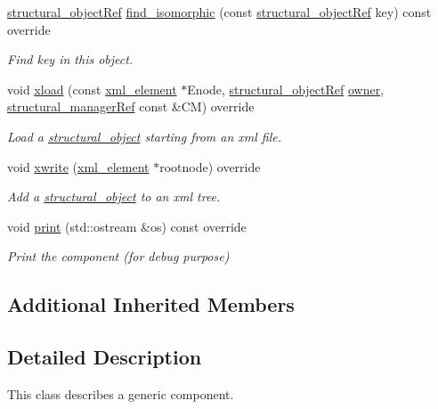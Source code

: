\begin{DoxyCompactItemize}
\hyperlink{structural__objects_8hpp_a8ea5f8cc50ab8f4c31e2751074ff60b2}{structural\+\_\+object\+Ref} \hyperlink{classcomponent__o_a8bb03d2af520a73c01e330f137fd9fd4}{find\+\_\+isomorphic} (const \hyperlink{structural__objects_8hpp_a8ea5f8cc50ab8f4c31e2751074ff60b2}{structural\+\_\+object\+Ref} key) const override
\begin{DoxyCompactList}\small\item\em Find key in this object. \end{DoxyCompactList}\item 
void \hyperlink{classcomponent__o_a988fbc4d1b4b677c8384c5781917dd1f}{xload} (const \hyperlink{classxml__element}{xml\+\_\+element} $\ast$Enode, \hyperlink{structural__objects_8hpp_a8ea5f8cc50ab8f4c31e2751074ff60b2}{structural\+\_\+object\+Ref} \hyperlink{classstructural__object_a3e96b3e00b8a78adfc44872d82e186ea}{owner}, \hyperlink{structural__manager_8hpp_ab3136f0e785d8535f8d252a7b53db5b5}{structural\+\_\+manager\+Ref} const \&CM) override
\begin{DoxyCompactList}\small\item\em Load a \hyperlink{classstructural__object}{structural\+\_\+object} starting from an xml file. \end{DoxyCompactList}\item 
void \hyperlink{classcomponent__o_a96fc64957b68763fbfc946efdbc0249e}{xwrite} (\hyperlink{classxml__element}{xml\+\_\+element} $\ast$rootnode) override
\begin{DoxyCompactList}\small\item\em Add a \hyperlink{classstructural__object}{structural\+\_\+object} to an xml tree. \end{DoxyCompactList}\item 
void \hyperlink{classcomponent__o_af842a5ea3400ce76c5fa2b9b33bcbf12}{print} (std\+::ostream \&os) const override
\begin{DoxyCompactList}\small\item\em Print the component (for debug purpose) \end{DoxyCompactList}\end{DoxyCompactItemize}
\subsection*{Additional Inherited Members}


\subsection{Detailed Description}
This class describes a generic component. 

